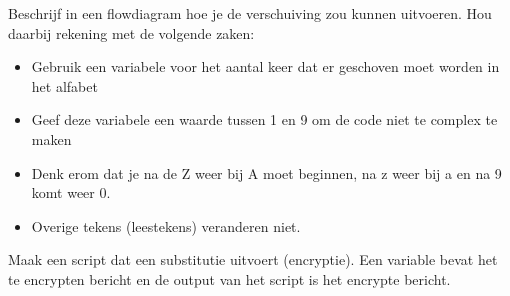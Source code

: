 Beschrijf in een flowdiagram hoe je de verschuiving zou kunnen uitvoeren. Hou daarbij rekening met de volgende zaken:
\begin{itemize}
	\item Gebruik een variabele voor het aantal keer dat er geschoven moet worden in het alfabet
	\item Geef deze variabele een waarde tussen 1 en 9 om de code niet te complex te maken
	\item Denk erom dat je na de Z weer bij A moet beginnen, na z weer bij a en na 9 komt weer 0.
	\item Overige tekens (leestekens) veranderen niet.
\end{itemize}

Maak een script dat een substitutie uitvoert (encryptie). Een variable bevat het te encrypten bericht en de output van het script is het encrypte bericht.

